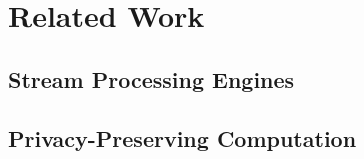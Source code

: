 \chapter{Related Work} \label{chap:related-work}

\section{Stream Processing Engines}

\section{Privacy-Preserving Computation}
